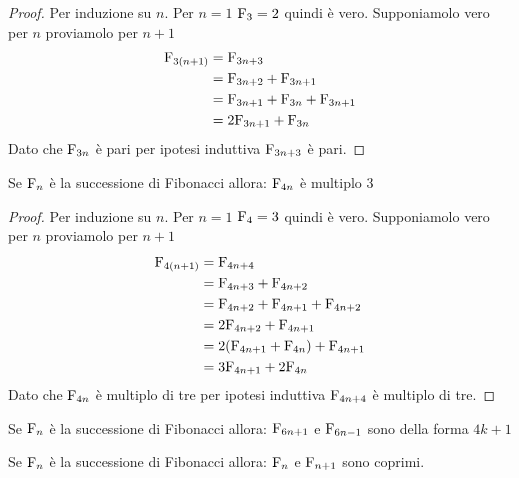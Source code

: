 \begin{proof}
	Per induzione su $n$. Per $n=1$ $\mathrm{F}_{3}=2$ quindi è vero. Supponiamolo
	vero per $n$ proviamolo per $n+1$
	\begin{align*}
		\mathrm{F}_{3(n+1)}={} & \mathrm{F}_{3n+3}                     \\
		={}             & \mathrm{F}_{3n+2}+\mathrm{F}_{3n+1}          \\
		={}             & \mathrm{F}_{3n+1}+\mathrm{F}_{3n}+\mathrm{F}_{3n+1} \\
		={}             & 2\mathrm{F}_{3n+1}+\mathrm{F}_{3n}           \\
	\end{align*}
	Dato che $\mathrm{F}_{3n}$ è pari per ipotesi induttiva $\mathrm{F}_{3n+3}$ è pari.
\end{proof}
\begin{thm}
	Se $\mathrm{F}_{n}$ è la successione di Fibonacci allora:
	$\mathrm{F}_{4n}$ è multiplo $3$\label{eqn:Fib4multiploditre}
\end{thm}
\begin{proof}
	Per induzione su $n$. Per $n=1$ $\mathrm{F}_{4}=3$ quindi è vero. Supponiamolo
	vero per $n$ proviamolo per $n+1$
	\begin{align*}
		\mathrm{F}_{4(n+1)}={} & \mathrm{F}_{4n+4}                        \\
		={}             & \mathrm{F}_{4n+3}+\mathrm{F}_{4n+2}             \\
		={}             & \mathrm{F}_{4n+2}+\mathrm{F}_{4n+1}+\mathrm{F}_{4n+2}  \\
		={}             & 2\mathrm{F}_{4n+2}+\mathrm{F}_{4n+1}            \\
		={}             & 2(\mathrm{F}_{4n+1}+\mathrm{F}_{4n})+\mathrm{F}_{4n+1} \\
		={}             & 3\mathrm{F}_{4n+1}+2\mathrm{F}_{4n}             \\
	\end{align*}
	Dato che $\mathrm{F}_{4n}$ è multiplo di tre per ipotesi induttiva $\mathrm{F}_{4n+4}$ è
	multiplo di tre.
\end{proof}
\begin{thm}
	Se $\mathrm{F}_{n}$ è la successione di Fibonacci allora:
	$\mathrm{F}_{6n+1}$ e $\mathrm{F}_{6n-1}$ sono della forma $4k+1$
\end{thm}
\begin{thm}\label{thm:FibonacciCoPrimi}
	Se $\mathrm{F}_{n}$ è la successione di Fibonacci allora:
	$\mathrm{F}_{n}$ e $\mathrm{F}_{n+1}$ sono coprimi.
\end{thm}\cite{Gregorio2022}
